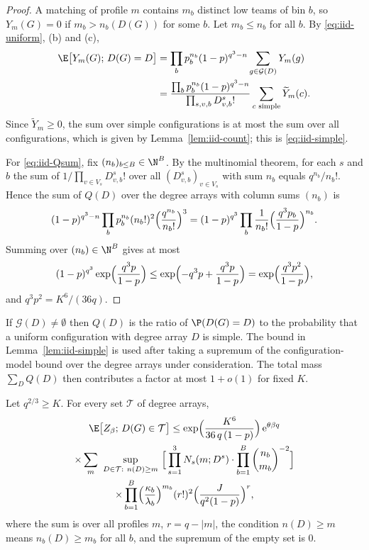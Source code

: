 \begin{proof}
A matching of profile $m$ contains $m_b$ distinct low teams of bin $b$, so $Y_m(G)=0$ if
$m_b>n_b(D(G))$ for some $b$. Let $m_b\le n_b$ for all $b$. By \eqref{eq:iid-uniform}, (b)
and (c),
\begin{align*}
\E\bigl[Y_m(G);\,D(G)=D\bigr]
&=\prod_bp_b^{n_b}(1-p)^{q^3-n}\sum_{g\in\mathcal{G}(D)}Y_m(g)\\
&=\frac{\prod_bp_b^{n_b}(1-p)^{q^3-n}}{\prod_{s,v,b}D^s_{v,b}!}
 \sum_{c\text{ simple}}\widetilde Y_m(c).
\end{align*}
Since $\widetilde Y_m\ge0$, the sum over simple configurations is at most the sum over all
configurations, which is given by Lemma~\ref{lem:iid-count}; this is \eqref{eq:iid-simple}.

For \eqref{eq:iid-Qsum}, fix $(n_b)_{b\le B}\in\N^B$. By the multinomial theorem, for each
$s$ and $b$ the sum of $1/\prod_{v\in V_s}D^s_{v,b}!$ over all $(D^s_{v,b})_{v\in V_s}$
with sum $n_b$ equals $q^{n_b}/n_b!$. Hence the sum of $Q(D)$ over the degree arrays with
column sums $(n_b)$ is
\[
(1-p)^{q^3-n}\prod_bp_b^{n_b}(n_b!)^2\Bigl(\frac{q^{n_b}}{n_b!}\Bigr)^3
=(1-p)^{q^3}\prod_b\frac1{n_b!}\Bigl(\frac{q^3p_b}{1-p}\Bigr)^{n_b}.
\]
Summing over $(n_b)\in\N^B$ gives at most
\[
(1-p)^{q^3}\exp\Bigl(\frac{q^3p}{1-p}\Bigr)\le\exp\Bigl(-q^3p+\frac{q^3p}{1-p}\Bigr)
=\exp\Bigl(\frac{q^3p^2}{1-p}\Bigr),
\]
and $q^3p^2=K^6/(36q)$.
\end{proof}

\begin{remark}\label{rem:iid-simple}
If $\mathcal{G}(D)\neq\emptyset$ then $Q(D)$ is the ratio of $\P(D(G)=D)$ to the
probability that a uniform configuration with degree array $D$ is simple.
The bound in Lemma~\ref{lem:iid-simple} is used after taking a supremum of the
configuration-model bound over the degree arrays under consideration. The total
mass $\sum_D Q(D)$ then contributes a factor at most $1+o(1)$ for fixed $K$.
\end{remark}

\begin{lemma}\label{lem:iid-first-moment}
Let $q^{2/3}\ge K$. For every set $\mathcal{T}$ of degree arrays,
\begin{multline}\label{eq:iid-first-moment}
\E\bigl[Z_\beta;\,D(G)\in\mathcal{T}\bigr]\le
\exp\Bigl(\frac{K^6}{36\,q\,(1-p)}\Bigr)\,\mathrm{e}^{\theta\beta q}\\
\times\sum_{m}\ \sup_{D\in\mathcal{T}:\ n(D)\ge m}\ \Bigl[\,\prod_{s=1}^3N_s(m;D^s)\cdot
\prod_{b=1}^B\binom{n_b}{m_b}^{-2}\Bigr]\\
\times\prod_{b=1}^B\Bigl(\frac{\kappa_b}{\lambda_b}\Bigr)^{m_b}(r!)^2
\Bigl(\frac{J}{q^2(1-p)}\Bigr)^{r},
\end{multline}
where the sum is over all profiles $m$, $r=q-|m|$, the condition $n(D)\ge m$ means
$n_b(D)\ge m_b$ for all $b$, and the supremum of the empty set is $0$.
\end{lemma}

